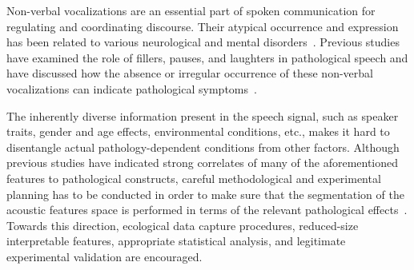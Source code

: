 \documentclass{article}
\begin{document}
Non-verbal vocalizations are an essential part of spoken communication for regulating and coordinating discourse. Their atypical occurrence and expression has been related to various neurological and mental disorders~\cite{lake2011listener}. Previous studies have examined the role of fillers, pauses, and laughters in pathological speech and have discussed how the absence or irregular occurrence of these non-verbal vocalizations can indicate pathological symptoms~\cite{heeman2010autism,lake2011listener,gupta2014predicting}.

The inherently diverse information present in the speech signal, such as speaker traits, gender and age effects, environmental conditions, etc., makes it hard to disentangle actual pathology-dependent conditions from other factors. Although previous studies have indicated strong correlates of many of the aforementioned features to pathological constructs, careful methodological and experimental planning has to be conducted in order to make sure that the segmentation of the acoustic features space is performed in terms of the relevant pathological effects~\cite{bone2013classifying}. Towards this direction, ecological data capture procedures, reduced-size interpretable features, appropriate statistical analysis, and legitimate experimental validation are encouraged.
\end{document}
